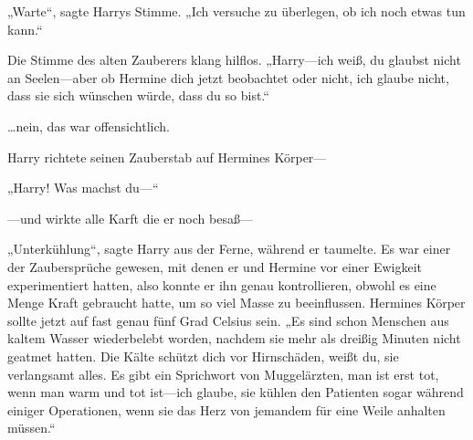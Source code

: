 „Warte“, sagte Harrys Stimme. „Ich versuche zu überlegen, ob ich noch etwas tun kann.“

Die Stimme des alten Zauberers klang hilflos. „Harry—ich weiß, du glaubst nicht an Seelen—aber ob Hermine dich jetzt beobachtet oder nicht, ich glaube nicht, dass sie sich wünschen würde, dass du so bist.“

…nein, das war offensichtlich.

Harry richtete seinen Zauberstab auf Hermines Körper—

„Harry! Was machst du—“

—und wirkte alle Karft die er noch besaß—



„Unterkühlung“, sagte Harry aus der Ferne, während er taumelte. Es war einer der Zaubersprüche gewesen, mit denen er und Hermine vor einer Ewigkeit experimentiert hatten, also konnte er ihn genau kontrollieren, obwohl es eine Menge Kraft gebraucht hatte, um so viel Masse zu beeinflussen. Hermines Körper sollte jetzt auf fast genau fünf Grad Celsius sein. „Es sind schon Menschen aus kaltem Wasser wiederbelebt worden, nachdem sie mehr als dreißig Minuten nicht geatmet hatten. Die Kälte schützt dich vor Hirnschäden, weißt du, sie verlangsamt alles. Es gibt ein Sprichwort von Muggelärzten, man ist erst tot, wenn man warm und tot ist—ich glaube, sie kühlen den Patienten sogar während einiger Operationen, wenn sie das Herz von jemandem für eine Weile anhalten müssen.“

